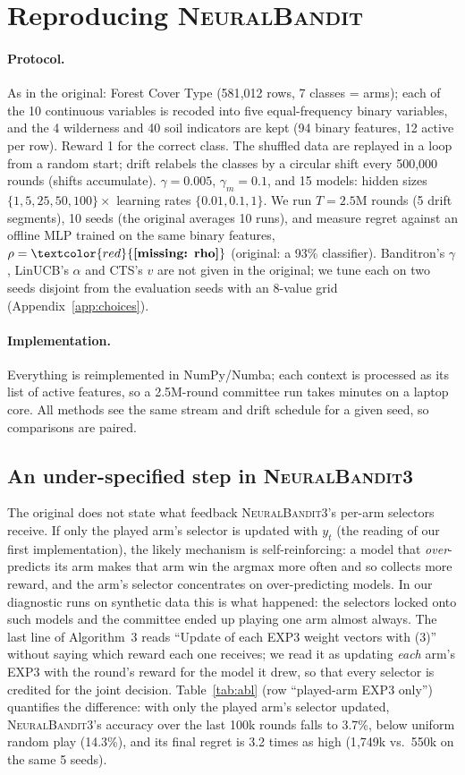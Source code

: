 \documentclass[sigconf]{acmart}
\newcommand{\missing}[1]{\textcolor{red}{\textbf{[missing: #1]}}}
\newcommand{\NB}{\textsc{NeuralBandit}}
\newcommand{\RefAcc}{\missing{rho}}
\begin{document}
\section{Reproducing \NB{}}\label{sec:repro}
\paragraph{Protocol.} As in the original: Forest Cover Type (581{,}012 rows, 7 classes = arms); each of the 10
continuous variables is recoded into five equal-frequency binary variables, and the 4 wilderness and 40 soil indicators
are kept (94 binary features, 12 active per row). Reward 1 for the correct class. The shuffled data are replayed in a
loop from a random start; drift relabels the classes by a circular shift every 500{,}000 rounds (shifts accumulate).
$\gamma=0.005$, $\gamma_m=0.1$, and 15 models: hidden sizes $\{1,5,25,50,100\}\times$ learning rates
$\{0.01,0.1,1\}$. We run $T=2.5$M rounds (5 drift segments), 10 seeds (the original averages 10 runs), and measure
regret against an offline MLP trained on the same binary features, $\rho=\RefAcc$ (original: a 93\% classifier).
Banditron's $\gamma$, LinUCB's $\alpha$ and CTS's $v$ are not given in the original; we tune each on two seeds disjoint
from the evaluation seeds with an 8-value grid (Appendix~\ref{app:choices}).

\paragraph{Implementation.} Everything is reimplemented in NumPy/Numba; each context is processed as its list of
active features, so a 2.5M-round committee run takes minutes on a laptop core. All methods see the same stream and
drift schedule for a given seed, so comparisons are paired.

\subsection{An under-specified step in \NB{}3}\label{sec:nb3}
The original does not state what feedback \NB{}3's per-arm selectors receive. If only the played arm's selector is
updated with $y_t$ (the reading of our first implementation), the likely mechanism is self-reinforcing: a model that
\emph{over}-predicts its arm makes that arm win the argmax more often and so collects more reward, and the arm's
selector concentrates on over-predicting models. In our diagnostic runs on synthetic data this is what happened: the
selectors locked onto such models and the committee ended up playing one arm almost always. The last line of Algorithm~3 reads ``Update of each EXP3 weight
vectors with (3)'' without saying which reward each one receives; we read it as updating \emph{each} arm's EXP3 with the
round's reward for the model it drew, so that every selector is credited for the joint decision. Table~\ref{tab:abl}
(row ``played-arm EXP3 only'') quantifies the difference: with only the played arm's selector updated, \NB{}3's
accuracy over the last 100k rounds falls to 3.7\%, below uniform random play (14.3\%), and its final regret is 3.2 times as high
(1{,}749k vs.\ 550k on the same 5 seeds).
\end{document}
